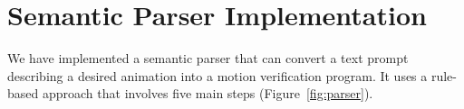 \section{Semantic Parser Implementation}
\label{sec:semanticParser}


We have implemented a semantic parser that can convert a text prompt
describing a desired animation into a \dslname{} motion verification
program. It uses a rule-based approach that involves five main steps
(Figure~\ref{fig:parser}).


%
%  
%  
%  

